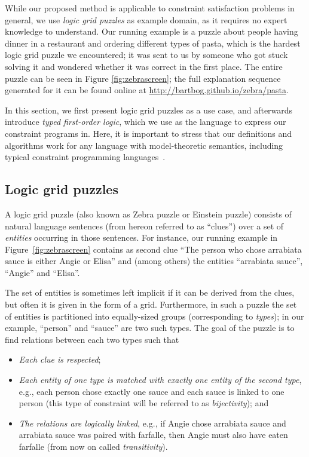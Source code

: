 While our proposed method is applicable to constraint satisfaction problems in general, we use \textit{logic grid puzzles} as example domain, as it requires no expert knowledge to understand.
Our running example is a puzzle about people having dinner in a restaurant and ordering different types of pasta, which is the hardest logic grid puzzle we encountered; it was sent to us by someone who got stuck solving it and wondered whether it was correct in the first place.    
The entire puzzle can be seen in Figure \ref{fig:zebrascreen}; the full explanation sequence generated for it can be found online at \url{http://bartbog.github.io/zebra/pasta}.

In this section, we first present logic grid puzzles as a use case, and afterwards introduce \emph{typed first-order logic}, which we use as the language to express our constraint programs in. Here, it is important to stress that our definitions and algorithms work for any language with model-theoretic semantics, including typical constraint programming languages~\cite{rossi2006handbook}.


\subsection{Logic grid puzzles}
A logic grid puzzle (also known as Zebra puzzle or Einstein puzzle) consists of natural language sentences (from hereon referred to as ``clues'') over a set of \emph{entities} occurring in those sentences. 
For instance, our running example in Figure~\ref{fig:zebrascreen} contains as second clue ``The person who chose arrabiata sauce is either Angie or Elisa'' and (among others) the entities ``arrabiata sauce'', ``Angie'' and ``Elisa''. 

The set of entities is sometimes left implicit if it can be derived from the clues, but often it is given in the form of a grid. 
Furthermore, in such a puzzle the set of entities is partitioned into equally-sized groups (corresponding to \emph{types}); in our example, ``person'' and ``sauce'' are two such types. 
% 
The goal of the puzzle is to find relations between each two types such that
\begin{itemize}
	\item \textit{Each clue is respected}; 
	\item \textit{Each entity of one type is matched with exactly one entity of the second type}, e.g., each person chose exactly one sauce and each sauce is linked to one person (this type of constraint will be referred to as \emph{bijectivity}); and 
	\item \textit{The relations are logically linked}, e.g., if Angie chose arrabiata sauce and arrabiata sauce was paired with farfalle, then Angie must also have eaten farfalle (from now on called \emph{transitivity}). 
\end{itemize}

